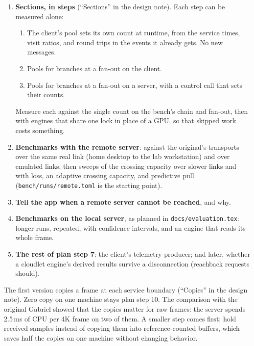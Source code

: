 \documentclass[11pt]{article}
\newcommand{\code}[1]{\texttt{#1}}
\begin{document}
\begin{enumerate}[nosep]
  \item \textbf{Sections, in steps} (``Sections'' in the design note).
        Each step can be measured alone:
        \begin{enumerate}[nosep]
          \item The client's pool sets its own count at runtime, from the
                service times, visit ratios, and round trips in the events
                it already gets. No new messages.
          \item Pools for branches at a fan-out on the client.
          \item Pools for branches at a fan-out on a server, with a control
                call that sets their counts.
        \end{enumerate}
        Measure each against the single count on the bench's chain and
        fan-out, then with engines that share one lock in place of a GPU,
        so that skipped work costs something.
  \item \textbf{Benchmarks with the remote server}: against the original's
        transports over the same real link (home desktop to the lab
        workstation) and over emulated links; then sweeps of the crossing
        capacity over slower links and with loss, an adaptive crossing
        capacity, and predictive pull (\code{bench/runs/remote.toml} is the
        starting point).
  \item \textbf{Tell the app when a remote server cannot be reached}, and
        why.
  \item \textbf{Benchmarks on the local server}, as planned in
        \code{docs/evaluation.tex}: longer runs, repeated, with confidence
        intervals, and an engine that reads its whole frame.
  \item \textbf{The rest of plan step 7}: the client's telemetry producer;
        and later, whether a cloudlet engine's derived results survive a
        disconnection (reachback requests should).
\end{enumerate}

The first version copies a frame at each service boundary
(``Copies'' in the design note). Zero copy on one machine stays plan
step 10. The comparison with the original Gabriel showed that the copies
matter for raw frames: the server spends 2.5\,ms of CPU per 4K frame on two
of them. A smaller step comes first: hold received samples instead of copying
them into reference-counted buffers, which saves half the copies on one
machine without changing behavior.
\end{document}
